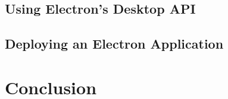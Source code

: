 \documentclass[11pt]{article}
\begin{document}
    \subsection{Using Electron's Desktop API}\label{subsec:developing-with-electron-angular-api}
    

    \subsection{Deploying an Electron Application}\label{subsec:developing-with-electron-angular-deployment}
    
    \clearpage

    \section{Conclusion}\label{sec:conclusion}
    
    \clearpage

    \printnoidxglossary[type=\acronymtype]
    \clearpage
    \listoffigures
    \clearpage
    \lstlistoflistings
    \clearpage
    \printbibliography
    
    
\end{document}
